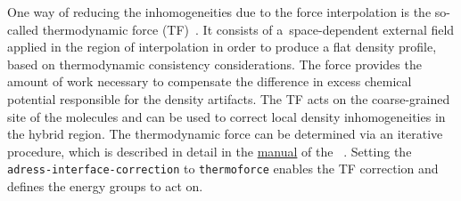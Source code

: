 One way of reducing the inhomogeneities due to the force interpolation is the so-called thermodynamic force (TF)~\cite{Poblete2010}.
It consists of a~space-dependent external field applied in the region of interpolation in order to produce a flat density profile, based on thermodynamic consistency considerations. The force provides the amount of work necessary to compensate the difference in excess chemical potential responsible for the density artifacts.
The TF acts on the coarse-grained site of the molecules and can be used to correct local density inhomogeneities in the hybrid region.
The thermodynamic force can be determined via an iterative procedure, which is described in detail in the \href{http://code.google.com/p/votca/downloads/list?&q=manual}{manual} of the ~\cite{ruehle2009}. Setting the {\tt adress-interface-correction} to {\tt thermoforce} enables the TF correction and defines the energy groups to act on.

